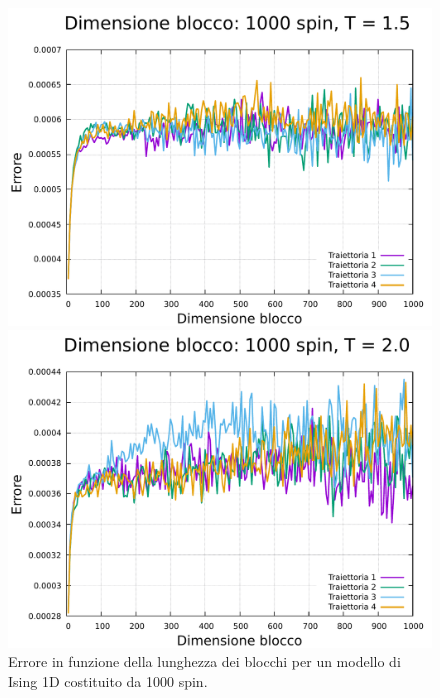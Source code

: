 \begin{figure}[htbp]
    \begin{minipage}{0.45\textwidth}  
      \centering
      \includegraphics[page=1, width=\textwidth]{Immagini/simIsing1D/magn0.0/lblk/err_1000_1.5.pdf}
      \caption{$T\,=\,1.5$}
    \end{minipage}\hfill
    \begin{minipage}{0.45\textwidth}  
      \centering
      \includegraphics[page=1, width=\textwidth]{Immagini/simIsing1D/magn0.0/lblk/err_1000_2.0.pdf}
      \caption{$T\,=\,2.0$}
    \end{minipage}
    \caption{Errore in funzione della lunghezza dei blocchi per un modello di Ising 1D costituito da 1000 spin.}
\end{figure}

